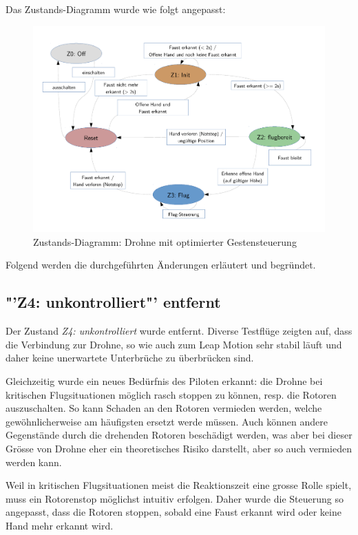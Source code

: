 Das Zustands-Diagramm wurde wie folgt angepasst:
\begin{figure}[H]
	\centering
	\includegraphics[width=1.0\textwidth]{figures/concept/state-diagram-2.pdf}
	\caption[Zustands-Diagramm: Drohne mit optimierter Gestensteuerung optimiert]{Zustands-Diagramm: Drohne mit optimierter Gestensteuerung}
	\label{key}
\end{figure}

Folgend werden die durchgeführten Änderungen erläutert und begründet.

\subsection{"'Z4: unkontrolliert"' entfernt}
Der Zustand \textit{Z4: unkontrolliert} wurde entfernt.
Diverse Testflüge zeigten auf, dass die Verbindung zur Drohne, so wie auch zum Leap Motion sehr stabil läuft und daher keine unerwartete Unterbrüche zu überbrücken sind.

Gleichzeitig wurde ein neues Bedürfnis des Piloten erkannt: die Drohne bei kritischen Flugsituationen möglich rasch stoppen zu können, resp. die Rotoren auszuschalten.
So kann Schaden an den Rotoren vermieden werden, welche gewöhnlicherweise am häufigsten ersetzt werde müssen.
Auch können andere Gegenstände durch die drehenden Rotoren beschädigt werden, was aber bei dieser Grösse von Drohne eher ein theoretisches Risiko darstellt, aber so auch vermieden werden kann.

Weil in kritischen Flugsituationen meist die Reaktionszeit eine grosse Rolle spielt, muss ein Rotorenstop möglichst intuitiv erfolgen.
Daher wurde die Steuerung so angepasst, dass die Rotoren stoppen, sobald eine Faust erkannt wird oder keine Hand mehr erkannt wird.

